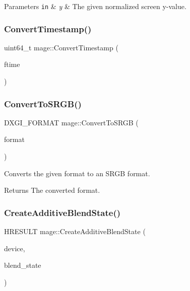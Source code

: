 \begin{DoxyParams}[1]{Parameters}
\mbox{\tt in}  & {\em y} & The given normalized screen y-\/value. \\
\hline
\end{DoxyParams}
\hypertarget{namespacemage_a75f2f48306b962f530412769c6187aa5}{}\label{namespacemage_a75f2f48306b962f530412769c6187aa5} 
\subsubsection{\texorpdfstring{Convert\+Timestamp()}{ConvertTimestamp()}}
{\footnotesize\ttfamily uint64\+\_\+t mage\+::\+Convert\+Timestamp (\begin{DoxyParamCaption}\item[{const F\+I\+L\+E\+T\+I\+ME \&}]{ftime }\end{DoxyParamCaption})}

\hypertarget{namespacemage_a9d84163ab692956f5f4537a965238a09}{}\label{namespacemage_a9d84163ab692956f5f4537a965238a09} 
\subsubsection{\texorpdfstring{Convert\+To\+S\+R\+G\+B()}{ConvertToSRGB()}}
{\footnotesize\ttfamily D\+X\+G\+I\+\_\+\+F\+O\+R\+M\+AT mage\+::\+Convert\+To\+S\+R\+GB (\begin{DoxyParamCaption}\item[{D\+X\+G\+I\+\_\+\+F\+O\+R\+M\+AT}]{format }\end{DoxyParamCaption})}

Converts the given format to an S\+R\+GB format.

\begin{DoxyReturn}{Returns}
The converted format. 
\end{DoxyReturn}
\hypertarget{namespacemage_a5c813464cd190784dec2d505d3254917}{}\label{namespacemage_a5c813464cd190784dec2d505d3254917} 
\subsubsection{\texorpdfstring{Create\+Additive\+Blend\+State()}{CreateAdditiveBlendState()}}
{\footnotesize\ttfamily H\+R\+E\+S\+U\+LT mage\+::\+Create\+Additive\+Blend\+State (\begin{DoxyParamCaption}\item[{I\+D3\+D11\+Device2 $\ast$}]{device,  }\item[{I\+D3\+D11\+Blend\+State $\ast$$\ast$}]{blend\+\_\+state }\end{DoxyParamCaption})}

